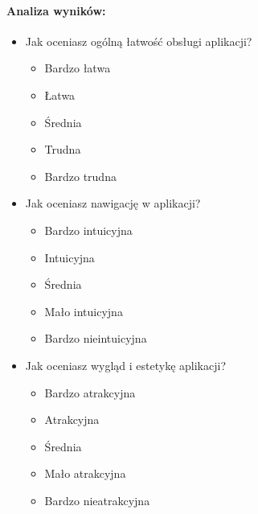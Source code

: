 \paragraph{Analiza wyników:}
\begin{itemize}
  \item Jak oceniasz ogólną łatwość obsługi aplikacji?
    \begin{itemize}
      \item Bardzo łatwa
      \item Łatwa
      \item Średnia
      \item Trudna
      \item Bardzo trudna
    \end{itemize}
  \item Jak oceniasz nawigację w aplikacji?
    \begin{itemize}
      \item Bardzo intuicyjna
      \item Intuicyjna
      \item Średnia
      \item Mało intuicyjna
      \item Bardzo nieintuicyjna
    \end{itemize}
  \item Jak oceniasz wygląd i estetykę aplikacji?
    \begin{itemize}
      \item Bardzo atrakcyjna
      \item Atrakcyjna
      \item Średnia
      \item Mało atrakcyjna
      \item Bardzo nieatrakcyjna
    \end{itemize}
\end{itemize}

